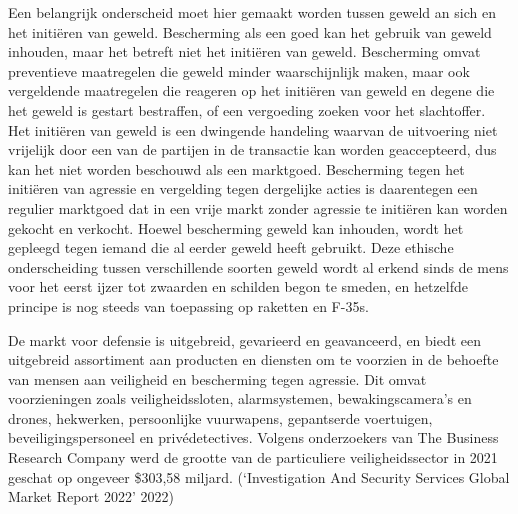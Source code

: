 \documentclass[
  a5paper,
  smalldemyvopaper,11pt,twoside,onecolumn,openright,extrafontsizes,
hidelinks]{memoir}
\begin{document}
Een belangrijk onderscheid moet hier gemaakt worden tussen geweld an
sich en het initiëren van geweld. Bescherming als een goed kan het
gebruik van geweld inhouden, maar het betreft niet het initiëren van
geweld. Bescherming omvat preventieve maatregelen die geweld minder
waarschijnlijk maken, maar ook vergeldende maatregelen die reageren op
het initiëren van geweld en degene die het geweld is gestart bestraffen,
of een vergoeding zoeken voor het slachtoffer. Het initiëren van geweld
is een dwingende handeling waarvan de uitvoering niet vrijelijk door een
van de partijen in de transactie kan worden geaccepteerd, dus kan het
niet worden beschouwd als een marktgoed. Bescherming tegen het initiëren
van agressie en vergelding tegen dergelijke acties is daarentegen een
regulier marktgoed dat in een vrije markt zonder agressie te initiëren
kan worden gekocht en verkocht. Hoewel bescherming geweld kan inhouden,
wordt het gepleegd tegen iemand die al eerder geweld heeft gebruikt.
Deze ethische onderscheiding tussen verschillende soorten geweld wordt
al erkend sinds de mens voor het eerst ijzer tot zwaarden en schilden
begon te smeden, en hetzelfde principe is nog steeds van toepassing op
raketten en F-35s.

De markt voor defensie is uitgebreid, gevarieerd en geavanceerd, en
biedt een uitgebreid assortiment aan producten en diensten om te
voorzien in de behoefte van mensen aan veiligheid en bescherming tegen
agressie. Dit omvat voorzieningen zoals veiligheidssloten,
alarmsystemen, bewakingscamera's en drones, hekwerken, persoonlijke
vuurwapens, gepantserde voertuigen, beveiligingspersoneel en
privédetectives. Volgens onderzoekers van The Business Research Company
werd de grootte van de particuliere veiligheidssector in 2021 geschat op
ongeveer \$303,58 miljard. ({`Investigation And Security Services Global
Market Report 2022'} 2022)
\end{document}
